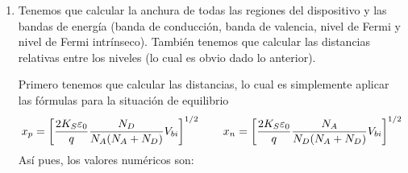\begin{enumerate}[label=\alph*)]
    \item Tenemos que calcular la anchura de todas las regiones del dispositivo y las bandas de energía (banda de conducción, banda de valencia, nivel de Fermi y nivel de Fermi intrínseco). También tenemos que calcular las distancias relativas entre los niveles (lo cual es obvio dado lo anterior). 
    
    Primero tenemos que calcular las distancias, lo cual es simplemente aplicar las fórmulas para la situación de equilibrio
    \begin{equation}
        x_p = \left[ \frac{2K_S\varepsilon_0}{q} \frac{N_D}{N_A(N_A+N_D)}  V_{bi} \right]^{1/2}  \qquad 
        x_n = \left[ \frac{2K_S\varepsilon_0}{q} \frac{N_A}{N_D(N_A+N_D)}  V_{bi} \right]^{1/2}
    \end{equation}
    Así pues, los valores numéricos son: 


\end{enumerate}
